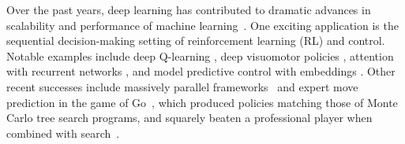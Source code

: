
Over the past years, deep learning has contributed to dramatic advances in scalability and performance of machine learning~\cite{LeCun:2015}. One exciting application is the sequential decision-making setting of reinforcement learning (RL) and control. Notable examples include deep Q-learning \cite{Mnih:2015}, deep visuomotor policies \cite{levine2015end}, attention with recurrent networks \cite{Ba:2015}, and model predictive control with embeddings \cite{Watter:2015}. Other  recent successes include massively parallel frameworks~\cite{Nair:2015} and expert move prediction in the game of Go~\cite{Maddison:2015}, which produced policies matching those of Monte Carlo tree search programs, and squarely beaten a professional player when combined with search~\cite{alphago}.

